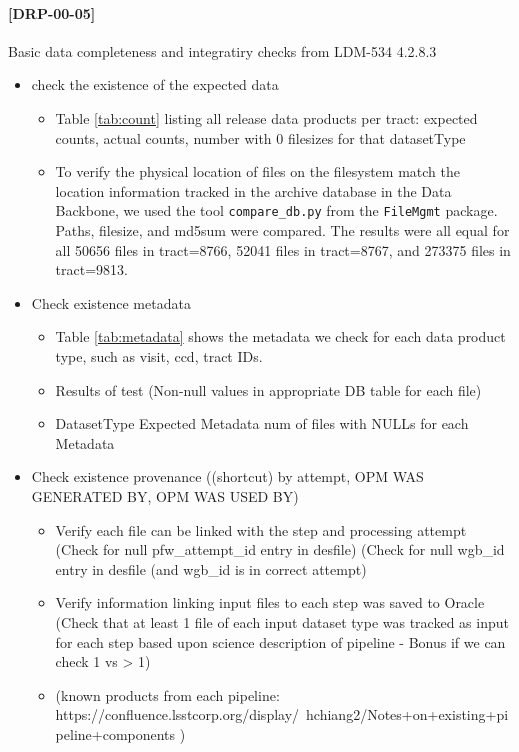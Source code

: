 \documentclass[DM,lsstdraft,STR,toc]{lsstdoc}
\begin{document}
\paragraph{[DRP-00-05]}
Basic data completeness and integratiry checks from LDM-534 4.2.8.3
\begin{itemize}
  \item check the existence of the expected data
  \begin{itemize}
    \item Table \ref{tab:count} listing all release data products per tract:  expected counts, actual counts, number with 0 filesizes for that datasetType
    
    \item To verify the physical location of files on the filesystem
	  match the location information tracked in the archive
	  database in the Data Backbone, we used the tool
	  \texttt{compare{\_}db.py} from the \texttt{FileMgmt}
	  package.  Paths, filesize, and md5sum were compared. The
	  results were all equal for all 50656 files in tract=8766,
	  52041 files in tract=8767, and 273375 files in tract=9813.
  \end{itemize}
  \item Check existence metadata
  \begin{itemize}
    \item Table \ref{tab:metadata} shows the metadata we check for each data product type, such as visit, ccd, tract IDs.

    \item Results of test (Non-null values in appropriate DB table for each file)
    \item DatasetType Expected Metadata num of files with NULLs for each Metadata
  \end{itemize}
  \item Check existence provenance ((shortcut) by attempt, OPM WAS GENERATED BY, OPM WAS USED BY)
  \begin{itemize}
    \item Verify each file can be linked with the step and processing attempt
          (Check for null pfw{\_}attempt{\_}id entry in desfile)
          (Check for null wgb{\_}id entry in desfile (and wgb{\_}id is in correct attempt)
    \item Verify information linking input files to each step was saved to Oracle
          (Check that at least 1 file of each input dataset type was tracked as input for each step based upon science description of pipeline - Bonus if we can check 1 vs > 1)
    \item (known products from each pipeline: https://confluence.lsstcorp.org/display/~hchiang2/Notes+on+existing+pipeline+components )

\end{itemize}
\end{itemize}
\end{document}
